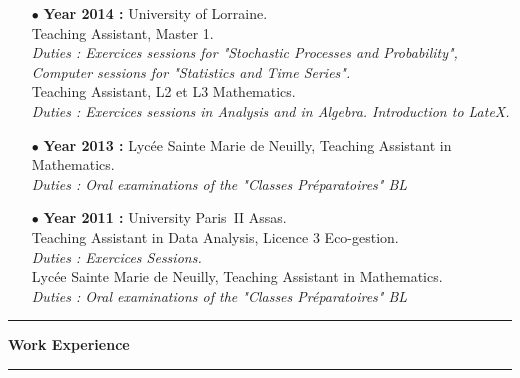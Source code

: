 \documentclass[a4paper,11pt]{article}
\newcommand{\titre}[1]{%
	\begin{center}
	\bigskip
	\rule{\textwidth}{1pt}
	\par\vspace{0.1cm}
        \textbf{\large #1}
	\par\rule{\textwidth}{1pt}
	\end{center}
	\bigskip
	}
\begin{document}
\begin{itemize}
\item[$\bullet$] \textbf{ Year 2014 :}  University of Lorraine.\\
					Teaching Assistant, Master 1. \\
					\textit{Duties : Exercices sessions for "Stochastic Processes and Probability", Computer sessions for "Statistics and Time Series".}\\
					Teaching Assistant, L2 et L3 Mathematics. \\
					\textit{Duties : Exercices sessions in Analysis and in Algebra. Introduction to LateX.}\\
\item[$\bullet$] \textbf{ Year 2013 :} Lycée Sainte Marie de Neuilly, Teaching Assistant in Mathematics. \\
					\textit{Duties : Oral examinations of the "Classes Préparatoires" BL} \\
\item[$\bullet$] \textbf{ Year 2011 :} University Paris~II Assas.\\
					Teaching Assistant in Data Analysis, Licence 3 Eco-gestion.\\
					\textit{Duties : Exercices Sessions.}\\
					Lycée Sainte Marie de Neuilly, Teaching Assistant in Mathematics. \\
					\textit{Duties : Oral examinations of the "Classes Préparatoires" BL} 
\end{itemize}

\titre{Work Experience}
\end{document}
